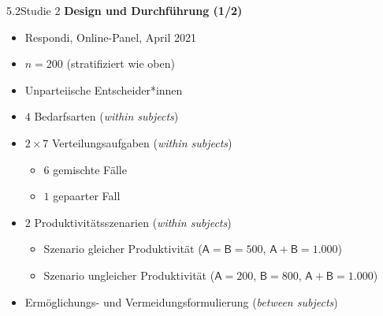\documentclass[xcolor=table,9pt,aspectratio=169]{beamer}
\begin{document}
\begin{frame}{\vspace*{10mm}5.2\hspace*{1em}Studie 2}
\textbf{Design und Durchführung (1/2)}\\
\medskip
\begin{itemize}
   \item Respondi, Online-Panel, April 2021
   \item $n=200$ (stratifiziert wie oben)
   \item Unparteiische Entscheider*innen
   \item $4$ Bedarfsarten (\textit{within subjects})
   \item $2\times7$ Verteilungsaufgaben (\textit{within subjects})
   \begin{itemize}
      \item $6$ gemischte Fälle
      \item $1$ gepaarter Fall
   \end{itemize}
   \item $2$ Produktivitätsszenarien (\textit{within subjects})
   \begin{itemize}
      \item Szenario gleicher Produktivität ($\textsf{A}=\textsf{B}=500$, $\textsf{A}+\textsf{B}=1.000$)
      \item Szenario ungleicher Produktivität ($\textsf{A}=200$, $\textsf{B}=800$, $\textsf{A}+\textsf{B}=1.000$)
   \end{itemize}
   \item Ermöglichungs- und Vermeidungsformulierung (\textit{between subjects})
\end{itemize}
\end{frame}
\end{document}

